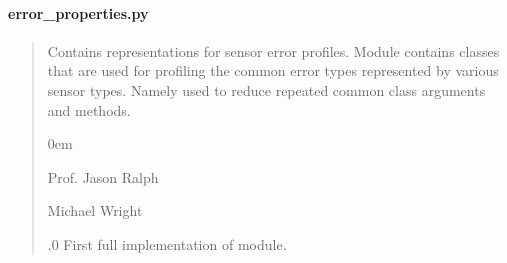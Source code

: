 \documentclass[letterpaper,10pt,english]{sphinxmanual}
\begin{document}
\paragraph{error\_properties.py}
\label{\detokenize{modules/measurement/error_properties:error-properties-py}}\begin{quote}\begin{description}
\sphinxAtStartPar
Contains representations for sensor error profiles.
Module contains classes that are used for profiling the common error
types represented by various sensor types. Namely used to reduce
repeated common class arguments and methods.

\begin{DUlineblock}{0em}
\item[] Prof. Jason Ralph \sphinxhyphen{} 
\item[] Michael Wright \sphinxhyphen{} 
\end{DUlineblock}

.0 \sphinxhyphen{} First full implementation of module.

\end{description}\end{quote}
\end{document}
